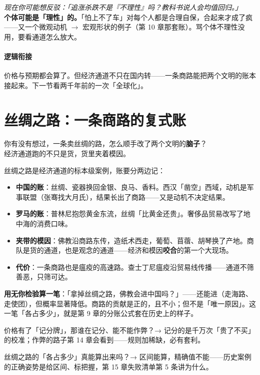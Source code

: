 \documentclass[../../main2.tex]{subfiles}
\begin{document}
\begin{questionbox}
	\textit{现在你可能想反驳：「追涨杀跌不是『不理性』吗？教科书说人会均值回归。」}\\
	\textbf{个体可能是「理性」的。}「怕上不了车」对每个人都是合理自保，合起来才成了疯——又一个微观动机 $\rightarrow$ 宏观形状的例子（第 10 章那套账）。骂个体不理性没用，要看通道怎么放大。
\end{questionbox}

\paragraph*{逻辑衔接}
	价格与预期都会算了。但经济通道不只在国内转——一条商路能把两个文明的账本接起来。下一节看两千年前的一次「全球化」。

\section{丝绸之路：一条商路的复式账}

\begin{readingnote}
	你有没有想过，一条卖丝绸的路，怎么顺手改了两个文明的\textbf{脑子}？\\
	经济通道跑的不只是货，货里夹着模因。
\end{readingnote}

丝绸之路是经济通道的标本级案例，账要分两边记：

\begin{itemize}
	\item \textbf{中国的账}：丝绸、瓷器换回金银、良马、香料。西汉「凿空」西域，动机是军事联盟（张骞找大月氏），结果长出了商路——又是动机不决定结果。
	\item \textbf{罗马的账}：普林尼抱怨黄金东流，丝绸「比黄金还贵」。奢侈品贸易改写了地中海的消费口味。
	\item \textbf{夹带的模因}：佛教沿商路东传，造纸术西走，葡萄、苜蓿、胡琴换了产地。商队是货的通道，也是观念的通道——经济和模因\textbf{咬合}的第一个大现场。
	\item \textbf{代价}：一条商路也是瘟疫的高速路。查士丁尼瘟疫沿贸易线传播——通道不筛善恶，只筛可达。
\end{itemize}

\textbf{用无你检验算一笔}：「拿掉丝绸之路，佛教会进中国吗？」——还能进（走海路、走使团），但概率显著降低。商路的贡献是正的，且不小；但不是「唯一原因」。这一笔「各占多少」，就是第 9 章的分账公式套在历史上的样子。

\begin{reader_anticipation}
	\item 价格有了「记分牌」，那谁在记分、能不能作弊？→ 记分的是千万次「贵了不买」的校准；作弊的路子第 14 章会看到——规则加稀缺，必有套利。
	\item 丝绸之路的「各占多少」真能算出来吗？→ 区间能算，精确值不能——历史案例的正确姿势是给区间、标把握，第 15 章失败清单第 5 条讲为什么。
\end{reader_anticipation}
\end{document}
